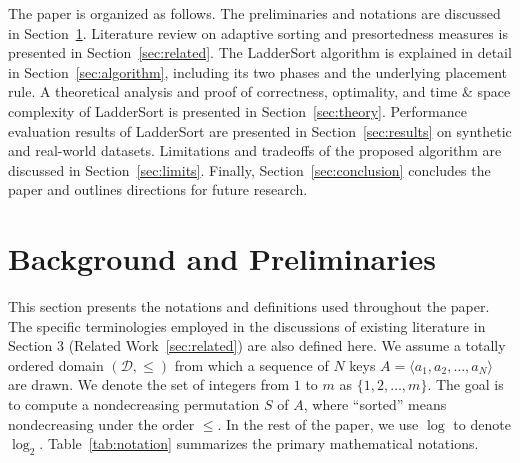 \documentclass{ieeeaccess}
\theoremstyle{plain}
\theoremstyle{definition}
\begin{document}
The paper is organized as follows. The preliminaries and notations are discussed in Section~\ref{sec:prelim}. Literature review on adaptive sorting and presortedness measures is presented in Section~\ref{sec:related}. The LadderSort algorithm is explained in detail in Section~\ref{sec:algorithm}, including its two phases and the underlying placement rule. A theoretical analysis and proof of correctness, optimality, and time \& space complexity of LadderSort is presented in Section~\ref{sec:theory}. Performance evaluation results of LadderSort are presented in Section~\ref{sec:results} on synthetic and real-world datasets. Limitations and tradeoffs of the proposed algorithm are discussed in Section~\ref{sec:limits}. Finally, Section~\ref{sec:conclusion} concludes the paper and outlines directions for future research.


\section{Background and Preliminaries}
\label{sec:prelim}
This section presents the notations and definitions used throughout the paper. The specific terminologies employed in the discussions of existing literature in Section 3 (Related Work~\ref{sec:related}) are also defined here. We assume a totally ordered domain $(\mathcal{D},\leq)$ from which a sequence of $N$ keys $A = \langle a_1, a_2, \ldots, a_N \rangle$ are drawn. We denote the set of integers from $1$ to $m$ as $\{1,2,\ldots,m\}$. The goal is to compute a nondecreasing permutation $S$ of $A$, where ``sorted'' means nondecreasing under the order $\leq$. In the rest of the paper, we use $\log$ to denote $\log_2$. Table~\ref{tab:notation} summarizes the primary mathematical notations.
 
\end{document}
